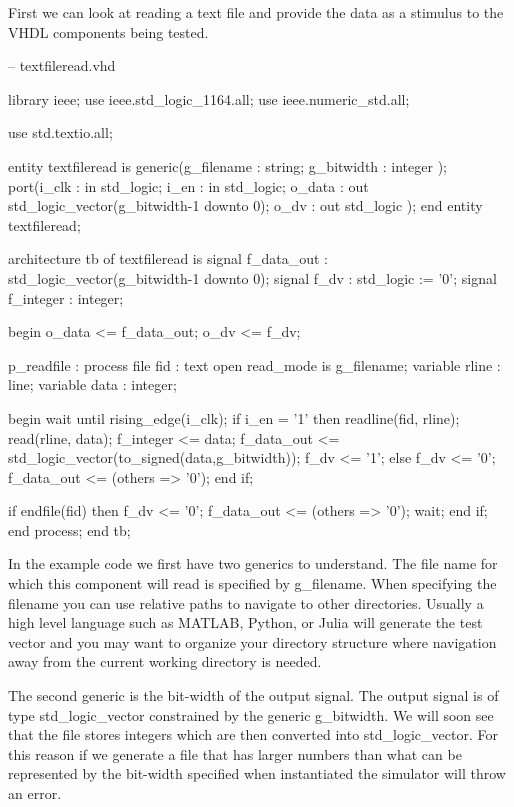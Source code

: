 First we can look at reading a text file and provide the data as a stimulus to the \ac{VHDL} components being tested. 

\begin{VHDLlisting}[tabsize=4]
-- textfileread.vhd

library	ieee;
    use ieee.std_logic_1164.all;
    use ieee.numeric_std.all;
    
    use std.textio.all;
	
entity textfileread is 
    generic(g_filename : string;
            g_bitwidth : integer
    );
    port(i_clk    : in    std_logic;
         i_en     : in    std_logic;
         o_data   :   out std_logic_vector(g_bitwidth-1 downto 0);
         o_dv     :   out std_logic	
    );
end entity textfileread;

architecture tb of textfileread is
    signal f_data_out : std_logic_vector(g_bitwidth-1 downto 0);
    signal f_dv       : std_logic := '0';
    signal f_integer  : integer;
	
begin
    o_data <= f_data_out;
    o_dv <= f_dv;
    
    p_readfile : process
        file fid       : text open read_mode is g_filename;		
        variable rline : line;
        variable data  : integer;
    	
    begin
        wait until rising_edge(i_clk);
        if i_en = '1' then
            readline(fid, rline);
            read(rline, data);
            f_integer <= data;
            f_data_out <= std_logic_vector(to_signed(data,g_bitwidth));
            f_dv <= '1';			
        else
            f_dv <= '0';
            f_data_out <= (others => '0');
        end if;
        
        if endfile(fid) then
            f_dv <= '0';
            f_data_out <= (others => '0');
            wait;
        end if;		
    end process;
end tb;
\end{VHDLlisting}

In the example code we first have two generics to understand. The file name for which this component will read is specified by g\_filename. When specifying the filename you can use relative paths to navigate to other directories. Usually a high level language such as MATLAB, Python, or Julia will generate the test vector and you may want to organize your directory structure where navigation away from the current working directory is needed. 

The second generic is the bit-width of the output signal. The output signal is of type std\_logic\_vector constrained by the generic g\_bitwidth. We will soon see that the file stores integers which are then converted into std\_logic\_vector. For this reason if we generate a file that has larger numbers than what can be represented by the bit-width specified when instantiated the simulator will throw an error.

